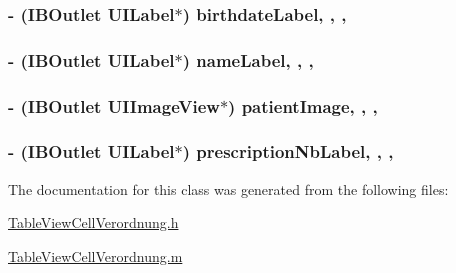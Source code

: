 \subsubsection[{birthdate\+Label}]{\setlength{\rightskip}{0pt plus 5cm}-\/ (I\+B\+Outlet U\+I\+Label$\ast$) birthdate\+Label\hspace{0.3cm}{\ttfamily [read]}, {\ttfamily [write]}, {\ttfamily [nonatomic]}, {\ttfamily [weak]}}\label{interface_table_view_cell_verordnung_a009099157047edee7cc4e28438a3ea1e}
\hypertarget{interface_table_view_cell_verordnung_a388a628e07339449cba18d141583d903}{}
\subsubsection[{name\+Label}]{\setlength{\rightskip}{0pt plus 5cm}-\/ (I\+B\+Outlet U\+I\+Label$\ast$) name\+Label\hspace{0.3cm}{\ttfamily [read]}, {\ttfamily [write]}, {\ttfamily [nonatomic]}, {\ttfamily [weak]}}\label{interface_table_view_cell_verordnung_a388a628e07339449cba18d141583d903}
\hypertarget{interface_table_view_cell_verordnung_a6bf7e26dbcb74e4871253168ee1f4641}{}
\subsubsection[{patient\+Image}]{\setlength{\rightskip}{0pt plus 5cm}-\/ (I\+B\+Outlet U\+I\+Image\+View$\ast$) patient\+Image\hspace{0.3cm}{\ttfamily [read]}, {\ttfamily [write]}, {\ttfamily [nonatomic]}, {\ttfamily [weak]}}\label{interface_table_view_cell_verordnung_a6bf7e26dbcb74e4871253168ee1f4641}
\hypertarget{interface_table_view_cell_verordnung_a5d7141645571b699a717547caa83ff10}{}
\subsubsection[{prescription\+Nb\+Label}]{\setlength{\rightskip}{0pt plus 5cm}-\/ (I\+B\+Outlet U\+I\+Label$\ast$) prescription\+Nb\+Label\hspace{0.3cm}{\ttfamily [read]}, {\ttfamily [write]}, {\ttfamily [nonatomic]}, {\ttfamily [weak]}}\label{interface_table_view_cell_verordnung_a5d7141645571b699a717547caa83ff10}


The documentation for this class was generated from the following files\+:\begin{DoxyCompactItemize}
\item 
\hyperlink{_table_view_cell_verordnung_8h}{Table\+View\+Cell\+Verordnung.\+h}\item 
\hyperlink{_table_view_cell_verordnung_8m}{Table\+View\+Cell\+Verordnung.\+m}\end{DoxyCompactItemize}
